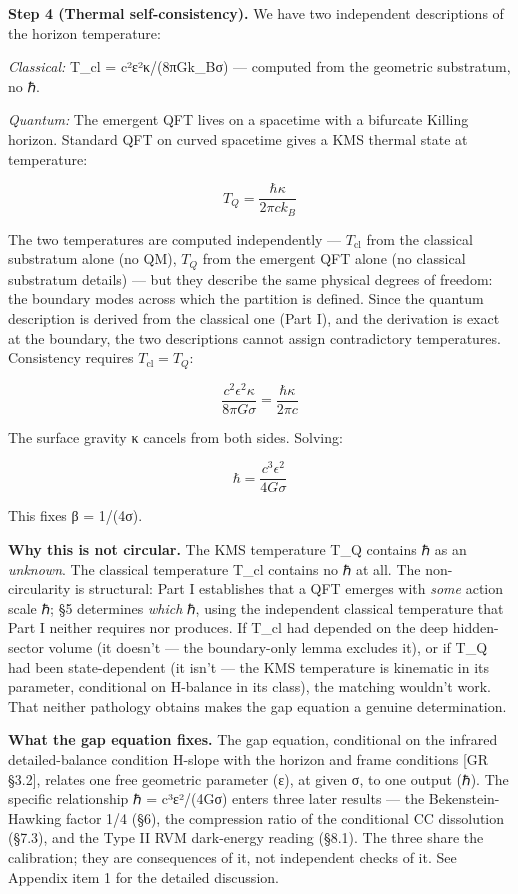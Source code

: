 \documentclass[
]{article}
\begin{document}
\textbf{Step 4 (Thermal self-consistency).} We have two independent
descriptions of the horizon temperature:

\emph{Classical:} T\_cl = c²ε²κ/(8πGk\_Bσ) --- computed from the
geometric substratum, no ℏ.

\emph{Quantum:} The emergent QFT lives on a spacetime with a bifurcate
Killing horizon. Standard QFT on curved spacetime gives a KMS thermal
state at temperature:

\[T_Q = \frac{\hbar \kappa}{2\pi c k_B}\]

The two temperatures are computed independently --- \(T_{\text{cl}}\)
from the classical substratum alone (no QM), \(T_Q\) from the emergent
QFT alone (no classical substratum details) --- but they describe the
same physical degrees of freedom: the boundary modes across which the
partition is defined. Since the quantum description is derived from the
classical one (Part I), and the derivation is exact at the boundary, the
two descriptions cannot assign contradictory temperatures. Consistency
requires \(T_{\text{cl}} = T_Q\):

\[\frac{c^2 \epsilon^2 \kappa}{8\pi G \sigma} = \frac{\hbar \kappa}{2\pi c}\]

The surface gravity κ cancels from both sides. Solving:

\[\boxed{\hbar = \frac{c^3 \epsilon^2}{4G\sigma}}\]

This fixes β = 1/(4σ).

\textbf{Why this is not circular.} The KMS temperature T\_Q contains ℏ
as an \emph{unknown}. The classical temperature T\_cl contains no ℏ at
all. The non-circularity is structural: Part I establishes that a QFT
emerges with \emph{some} action scale ℏ; §5 determines \emph{which} ℏ,
using the independent classical temperature that Part I neither requires
nor produces. If T\_cl had depended on the deep hidden-sector volume (it
doesn't --- the boundary-only lemma excludes it), or if T\_Q had been
state-dependent (it isn't --- the KMS temperature is kinematic in its
parameter, conditional on H-balance in its class), the matching wouldn't
work. That neither pathology obtains makes the gap equation a genuine
determination.

\textbf{What the gap equation fixes.} The gap equation, conditional on
the infrared detailed-balance condition H-slope with the horizon and
frame conditions {[}GR §3.2{]}, relates one free geometric parameter
(ε), at given σ, to one output (ℏ). The specific relationship ℏ =
c³ε²/(4Gσ) enters three later results --- the Bekenstein-Hawking factor
1/4 (§6), the compression ratio of the conditional CC dissolution
(§7.3), and the Type II RVM dark-energy reading (§8.1). The three share
the calibration; they are consequences of it, not independent checks of
it. See Appendix item 1 for the detailed discussion.
\end{document}

